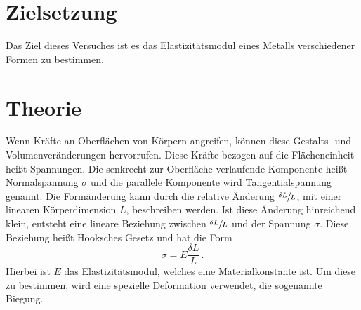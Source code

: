\section{Zielsetzung}
Das Ziel dieses Versuches ist es das Elastizitätsmodul eines Metalls verschiedener Formen zu bestimmen.

\section{Theorie}
\label{sec:Theorie}

Wenn Kräfte an Oberflächen von Körpern angreifen, können diese Gestalts- und Volumenveränderungen hervorrufen.
Diese Kräfte bezogen auf die Flächeneinheit heißt Spannungen.
Die senkrecht zur Oberfläche verlaufende Komponente heißt Normalspannung $\sigma$ und die parallele Komponente wird Tangentialspannung genannt.
Die Formänderung kann durch die relative Änderung $\sfrac{\delta L }{L}$, mit einer linearen Körperdimension $L$, beschreiben werden.
Ist diese Änderung hinreichend klein, entsteht eine lineare Beziehung zwischen $\sfrac{\delta L }{L}$ und der Spannung $\sigma$.
Diese Beziehung heißt Hooksches Gesetz und hat die Form
\begin{equation*}
    \sigma = E \frac{\delta L}{L}\,.
\end{equation*}
Hierbei ist $E$ das Elastizitätsmodul, welches eine Materialkonstante ist.
Um diese zu bestimmen, wird eine spezielle Deformation verwendet, die sogenannte Biegung.
